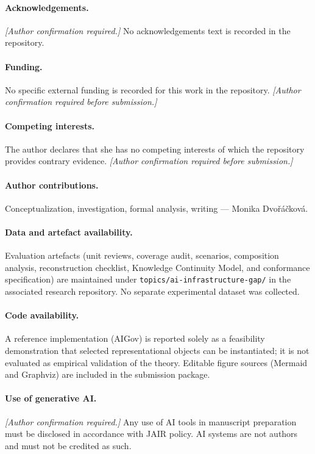 \documentclass[11pt,a4paper]{article}
\begin{document}
\paragraph{Acknowledgements.}
\textit{[Author confirmation required.]} No acknowledgements text is recorded in the repository.

\paragraph{Funding.}
No specific external funding is recorded for this work in the repository. \textit{[Author confirmation required before submission.]}

\paragraph{Competing interests.}
The author declares that she has no competing interests of which the repository provides contrary evidence. \textit{[Author confirmation required before submission.]}

\paragraph{Author contributions.}
Conceptualization, investigation, formal analysis, writing --- Monika Dvo\v{r}\'{a}\v{c}kov\'{a}.

\paragraph{Data and artefact availability.}
Evaluation artefacts (unit reviews, coverage audit, scenarios, composition analysis, reconstruction checklist, Knowledge Continuity Model, and conformance specification) are maintained under \texttt{topics/ai-infrastructure-gap/} in the associated research repository. No separate experimental dataset was collected.

\paragraph{Code availability.}
A reference implementation (AIGov) is reported solely as a feasibility demonstration that selected representational objects can be instantiated; it is not evaluated as empirical validation of the theory. Editable figure sources (Mermaid and Graphviz) are included in the submission package.

\paragraph{Use of generative AI.}
\textit{[Author confirmation required.]} Any use of AI tools in manuscript preparation must be disclosed in accordance with JAIR policy. AI systems are not authors and must not be credited as such.
\end{document}
